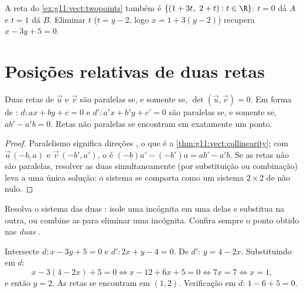 \begin{example}
A reta do \cref{ex:g11:vect:twopoints} também é
$\{(1 + 3t,\ 2 + t) : t \in \R\}$: $t = 0$ dá $A$ e $t = 1$ dá $B$.
Eliminar $t$ ($t = y - 2$, logo $x = 1 + 3(y-2)$) recupera
$x - 3y + 5 = 0$.
\end{example}

\section{Posições relativas de duas retas}

\begin{proposition}\label{prop:g11:vect:positions}
Duas retas de  $\vec u$ e $\vec v$ são paralelas se, e
somente se, $\det(\vec u, \vec v) = 0$. Em forma de :
$d : ax + by + c = 0$ e $d' : a'x + b'y + c' = 0$ são paralelas se, e
somente se, $ab' - a'b = 0$. Retas não paralelas se encontram em
exatamente um ponto.
\end{proposition}

\begin{proof}
Paralelismo significa direções , o que é a
\cref{thm:g11:vect:collinearity}; com $\vec u\,(-b, a)$ e
$\vec v\,(-b', a')$, o  é $(-b)a' - (-b')a = ab' - a'b$. Se
as retas não são paralelas, resolver as duas  simultaneamente
(por substituição ou combinação) leva a uma única solução: o sistema se
comporta como um sistema $2 \times 2$ de  não nulo.
\end{proof}

\begin{method}\label{met:g11:vect:intersection}
Resolva o sistema das duas : isole uma incógnita em uma delas e
substitua na outra, ou combine as  para eliminar uma incógnita.
Confira sempre o ponto obtido nas \emph{duas} .
\end{method}

\begin{example}\label{ex:g11:vect:intersection}
Intersecte $d: x - 3y + 5 = 0$ e $d': 2x + y - 4 = 0$. De $d'$:
$y = 4 - 2x$. Substituindo em $d$:
\[
x - 3(4 - 2x) + 5 = 0
\iff x - 12 + 6x + 5 = 0
\iff 7x = 7
\iff x = 1,
\]
e então $y = 2$. As retas se encontram em $(1, 2)$. Verificação em $d$:
$1 - 6 + 5 = 0$.
\end{example}

